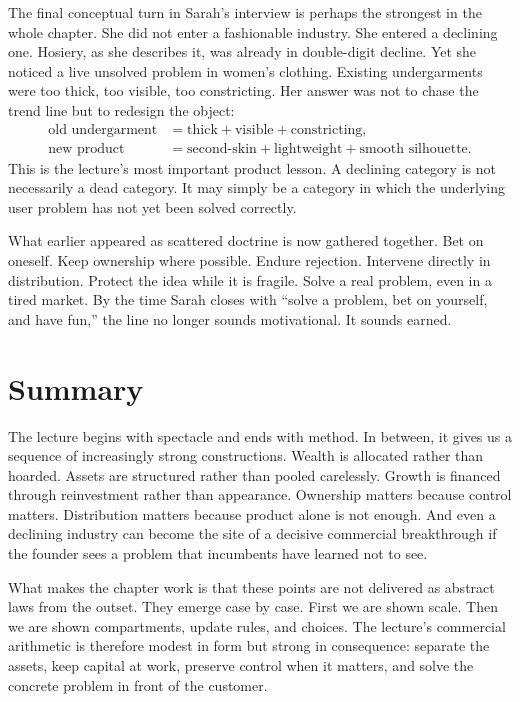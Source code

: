 The final conceptual turn in Sarah's interview is perhaps the strongest in the whole chapter. She did not enter a fashionable industry. She entered a declining one. Hosiery, as she describes it, was already in double-digit decline. Yet she noticed a live unsolved problem in women's clothing. Existing undergarments were too thick, too visible, too constricting. Her answer was not to chase the trend line but to redesign the object:
\begin{align}
\text{old undergarment} &=
\text{thick} + \text{visible} + \text{constricting}, \\
\text{new product} &=
\text{second-skin} + \text{lightweight} + \text{smooth silhouette}.
\end{align}
This is the lecture's most important product lesson. A declining category is not necessarily a dead category. It may simply be a category in which the underlying user problem has not yet been solved correctly.

What earlier appeared as scattered doctrine is now gathered together. Bet on oneself. Keep ownership where possible. Endure rejection. Intervene directly in distribution. Protect the idea while it is fragile. Solve a real problem, even in a tired market. By the time Sarah closes with ``solve a problem, bet on yourself, and have fun,'' the line no longer sounds motivational. It sounds earned.

\section{Summary}

The lecture begins with spectacle and ends with method. In between, it gives us a sequence of increasingly strong constructions. Wealth is allocated rather than hoarded. Assets are structured rather than pooled carelessly. Growth is financed through reinvestment rather than appearance. Ownership matters because control matters. Distribution matters because product alone is not enough. And even a declining industry can become the site of a decisive commercial breakthrough if the founder sees a problem that incumbents have learned not to see.

What makes the chapter work is that these points are not delivered as abstract laws from the outset. They emerge case by case. First we are shown scale. Then we are shown compartments, update rules, and choices. The lecture's commercial arithmetic is therefore modest in form but strong in consequence: separate the assets, keep capital at work, preserve control when it matters, and solve the concrete problem in front of the customer.